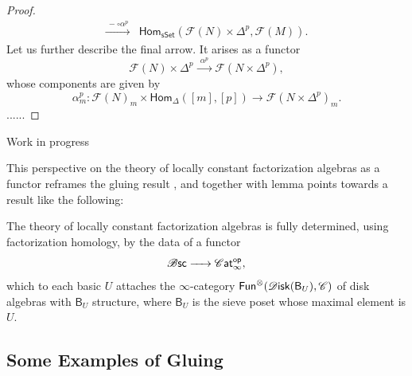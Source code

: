 \documentclass[../text]{subfiles}
\begin{document}
\begin{proof}
\begin{align}
        \xrightarrow{\ - \circ \alpha^p \ }& \mathsf{Hom_{sSet}} (\mathscr{F}(N) \times \Delta^p , \mathscr{F}(M)).
    \end{align}
    Let us further describe the final arrow. It arises as a functor
    \begin{equation}
        \mathscr{F} (N) \times \Delta^p \xrightarrow{\ \ \alpha^p \ \ } \mathscr{F}(N \times \Delta^p),
    \end{equation}
    whose components are given by
    \begin{equation}
        \alpha^p_m: \mathscr{F} (N)_m \times \mathsf{Hom}_{\Delta}([m], [p]) \xrightarrow{} \mathscr{F}(N \times \Delta^p)_m.
    \end{equation}
    ......
\end{proof}

{\color{red} Work in progress}

This perspective on the theory of locally constant factorization algebras as a functor reframes the gluing result , and together with lemma  points towards a result like the following:

\begin{conjecture}
    The theory of locally constant factorization algebras is fully determined, using factorization homology, by the data of a functor
    \begin{equation}
        \mathscr{B} \mathsf{sc} \xrightarrow{\ \ \ \ } \mathscr{C} \mathsf{at}_{\infty}^{\mathsf{op}},
    \end{equation}
    which to each basic $U$ attaches the $\infty$-category $\mathsf{Fun}^{\otimes} (\disk(\mathsf{B}_U), \catC)$ of disk algebras with $\mathsf{B}_U$ structure, where $\mathsf{B}_U$ is the sieve poset whose maximal element is $U$.
\end{conjecture}



\subsection{Some Examples of Gluing}
\end{document}
